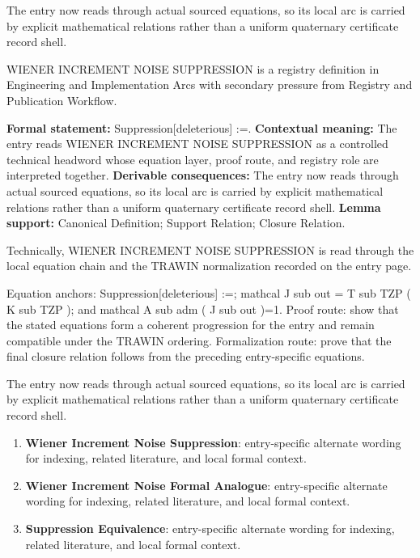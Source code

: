 The entry now reads through actual sourced equations, so its local arc is carried by explicit mathematical relations rather than a uniform quaternary certificate record shell.
\clearpage


\begingroup\small
{}
WIENER INCREMENT NOISE SUPPRESSION is a registry definition in Engineering and Implementation Arcs with secondary pressure from Registry and Publication Workflow.

\begingroup\footnotesize\setlength{\emergencystretch}{3em}\sloppy
\textbf{Formal statement:} Suppression[deleterious] :=. \textbf{Contextual meaning:} The entry reads WIENER INCREMENT NOISE SUPPRESSION as a controlled technical headword whose equation layer, proof route, and registry role are interpreted together. \textbf{Derivable consequences:} The entry now reads through actual sourced equations, so its local arc is carried by explicit mathematical relations rather than a uniform quaternary certificate record shell. \textbf{Lemma support:} Canonical Definition; Support Relation; Closure Relation.\par
\endgroup

Technically, WIENER INCREMENT NOISE SUPPRESSION is read through the local equation chain and the TRAWIN normalization recorded on the entry page.

Equation anchors: Suppression[deleterious] :=; mathcal J sub out = T sub TZP ( K sub TZP ); and mathcal A sub adm ( J sub out )=1. Proof route: show that the stated equations form a coherent progression for the entry and remain compatible under the TRAWIN ordering. Formalization route: prove that the final closure relation follows from the preceding entry-specific equations.

The entry now reads through actual sourced equations, so its local arc is carried by explicit mathematical relations rather than a uniform quaternary certificate record shell.
\endgroup

\begin{enumerate}[leftmargin=1.6em,itemsep=6pt,topsep=4pt]
\item \textbf{Wiener Increment Noise Suppression}: entry-specific alternate wording for indexing, related literature, and local formal context.
\item \textbf{Wiener Increment Noise Formal Analogue}: entry-specific alternate wording for indexing, related literature, and local formal context.
\item \textbf{Suppression Equivalence}: entry-specific alternate wording for indexing, related literature, and local formal context.
\end{enumerate}

